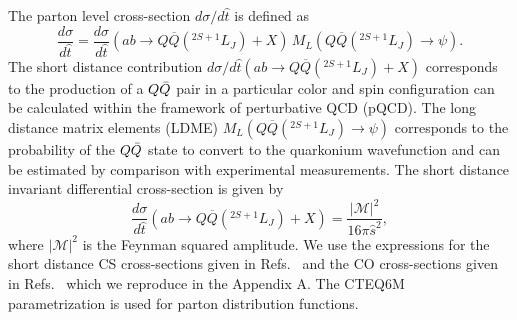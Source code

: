 \documentclass[aps,prc,preprint,superscriptaddress,showpacs,showkeys,amsmath]{revtex4-1}
\begin{document}
 The parton level cross-section $d\sigma/d\hat{t}$ is defined as~\cite{Bodwin:1994jh}
\begin{equation}
\frac{d\sigma}{d\hat t} = \frac{d\sigma}{d\hat t}(ab\rightarrow Q\overline{Q}(^{2S+1}L_{J})+X)
               \, M_{L}(Q\overline{Q}(^{2S+1}L_{J})\rightarrow\psi).
\end{equation}
  The short distance contribution 
$d\sigma/d\hat t (ab\rightarrow Q\overline{Q}(^{2S+1}L_{J})+X)$ 
corresponds to the production of a $Q{\bar{Q}}$ pair in a particular
color and spin configuration can be calculated within the framework of 
perturbative QCD (pQCD). The long distance matrix elements (LDME) 
$M_{L}(Q\overline{Q}(^{2S+1}L_{J})\rightarrow\psi)$ corresponds to the 
probability of the $Q{\bar{Q}}$ state to convert to the quarkonium wavefunction
and can be estimated by comparison with experimental measurements. 
 The short distance invariant differential cross-section is given by
\begin{equation}
  \frac{d\sigma}{d\hat t}(ab\rightarrow Q\overline{Q}(^{2S+1}L_{J})+X) 
                = \frac{|\mathcal{M}|^2}{16\pi{\hat s}^2},
\end{equation}
where $|\mathcal{M}|^2$ is the Feynman squared amplitude. We use the expressions for the 
short distance CS cross-sections given in 
Refs.~\cite{Baier:1983va,Humpert:1986cy,Gastmans:1987be} and the CO 
cross-sections given in Refs.~\cite{Cho:1995vh,Cho:1995ce,Braaten:2000cm} which
we reproduce in the Appendix A. 
  The CTEQ6M~\cite{Lai:2010vv} parametrization is used for parton 
distribution functions. 
\end{document}
